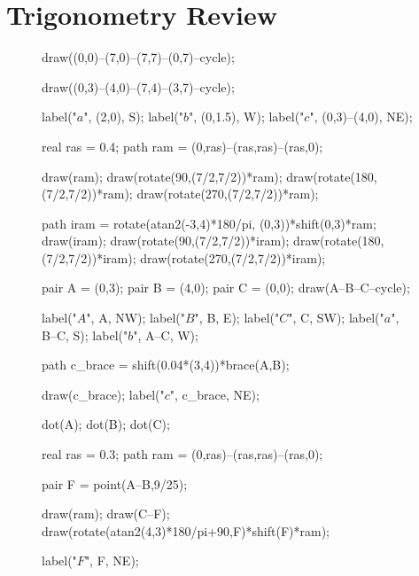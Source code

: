 \documentclass[../key.tex]{subfiles}
\begin{document}
\allowdisplaybreaks

\section{Trigonometry Review}

\begin{figure}[h]
	\begin{center}
		\begin{minipage}[b]{0.45\textwidth}
			\centering
			\begin{asy}[width=0.5\textwidth]
				draw((0,0)--(7,0)--(7,7)--(0,7)--cycle);
				
				draw((0,3)--(4,0)--(7,4)--(3,7)--cycle);
				
				label("$a$", (2,0), S);
				label("$b$", (0,1.5), W);
				label("$c$", (0,3)--(4,0), NE);
				
				real ras = 0.4;
				path ram = (0,ras)--(ras,ras)--(ras,0);
				
				draw(ram);
				draw(rotate(90,(7/2,7/2))*ram);
				draw(rotate(180,(7/2,7/2))*ram);
				draw(rotate(270,(7/2,7/2))*ram);
				
				path iram = rotate(atan2(-3,4)*180/pi, (0,3))*shift(0,3)*ram;
				draw(iram);
				draw(rotate(90,(7/2,7/2))*iram);
				draw(rotate(180,(7/2,7/2))*iram);
				draw(rotate(270,(7/2,7/2))*iram);
			\end{asy}
		\end{minipage}
		\hfill
		\begin{minipage}[b]{0.45\textwidth}
			\centering
			\begin{asy}[width=0.7\textwidth]
				pair A = (0,3);
				pair B = (4,0);
				pair C = (0,0);
				draw(A--B--C--cycle);
				
				label("$A$", A, NW);
				label("$B$", B, E);
				label("$C$", C, SW);
				label("$a$", B--C, S);
				label("$b$", A--C, W);
				
				path c_brace = shift(0.04*(3,4))*brace(A,B);
				
				draw(c_brace);
				label("$c$", c_brace, NE);
				
				dot(A);
				dot(B);
				dot(C);
				
				real ras = 0.3;
				path ram = (0,ras)--(ras,ras)--(ras,0);
				
				pair F = point(A--B,9/25);
				
				draw(ram);
				draw(C--F);
				draw(rotate(atan2(4,3)*180/pi+90,F)*shift(F)*ram);
				
				label("$F$", F, NE);
			

\end{asy}
\end{minipage}
\end{center}
\end{figure}
\end{document}
